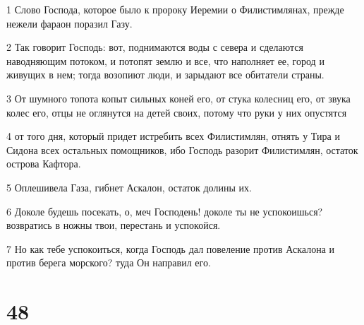 \par 1 Слово Господа, которое было к пророку Иеремии о Филистимлянах, прежде нежели фараон поразил Газу.
\par 2 Так говорит Господь: вот, поднимаются воды с севера и сделаются наводняющим потоком, и потопят землю и все, что наполняет ее, город и живущих в нем; тогда возопиют люди, и зарыдают все обитатели страны.
\par 3 От шумного топота копыт сильных коней его, от стука колесниц его, от звука колес его, отцы не оглянутся на детей своих, потому что руки у них опустятся
\par 4 от того дня, который придет истребить всех Филистимлян, отнять у Тира и Сидона всех остальных помощников, ибо Господь разорит Филистимлян, остаток острова Кафтора.
\par 5 Оплешивела Газа, гибнет Аскалон, остаток долины их.
\par 6 Доколе будешь посекать, о, меч Господень! доколе ты не успокоишься? возвратись в ножны твои, перестань и успокойся.
\par 7 Но как тебе успокоиться, когда Господь дал повеление против Аскалона и против берега морского? туда Он направил его.

\chapter{48}

